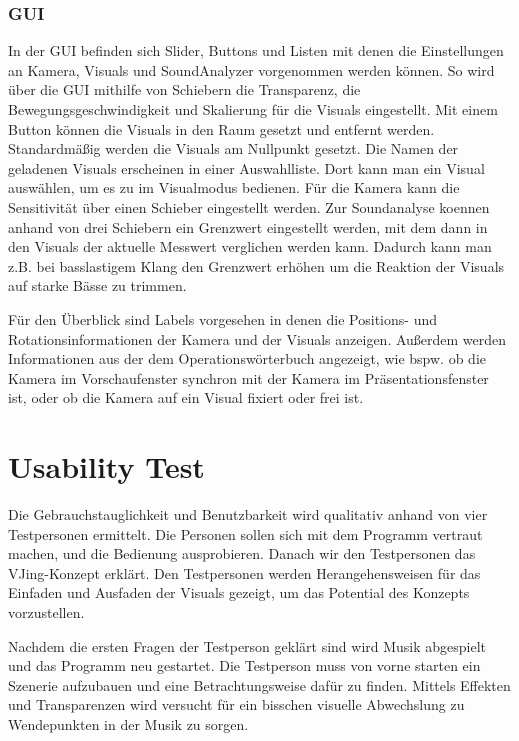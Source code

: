 \subsubsection{GUI}

In der GUI befinden sich Slider, Buttons und Listen mit denen die Einstellungen an Kamera, Visuals und SoundAnalyzer 
vorgenommen werden k\"onnen. So wird \"uber die GUI mithilfe von Schiebern die Transparenz, 
die Bewegungsgeschwindigkeit und Skalierung f\"ur die Visuals eingestellt. Mit einem Button k\"onnen die Visuals in den
Raum gesetzt und entfernt werden. Standardm\"a\ss{}ig werden die Visuals am Nullpunkt gesetzt. Die Namen der geladenen
Visuals erscheinen in einer Auswahlliste. Dort kann man ein Visual ausw\"ahlen, um es zu im Visualmodus bedienen.
F\"ur die Kamera kann die Sensitivit\"at \"uber einen Schieber eingestellt werden. Zur Soundanalyse koennen anhand von
drei Schiebern ein Grenzwert eingestellt werden, mit dem dann in den Visuals der aktuelle Messwert verglichen werden kann.
Dadurch kann man z.B. bei basslastigem Klang den Grenzwert erh\"ohen um die Reaktion der Visuals auf starke B\"asse zu 
trimmen. 

F\"ur den \"Uberblick sind Labels vorgesehen in denen die Positions- und Rotationsinformationen der Kamera und der Visuals
anzeigen. Au\ss{}erdem werden Informationen aus der dem Operationsw\"orterbuch angezeigt, wie bspw. ob die Kamera
im Vorschaufenster synchron mit der Kamera im Pr\"asentationsfenster ist, oder ob die Kamera auf ein Visual fixiert oder
frei ist.

\section{Usability Test}

Die Gebrauchstauglichkeit und Benutzbarkeit wird qualitativ anhand von vier Testpersonen ermittelt. Die Personen sollen
sich mit dem Programm vertraut machen, und die Bedienung ausprobieren. Danach wir den Testpersonen das VJing-Konzept
erkl\"art. Den Testpersonen werden Herangehensweisen f\"ur das Einfaden und Ausfaden der Visuals 
gezeigt, um das Potential des Konzepts vorzustellen. 

Nachdem die ersten Fragen der Testperson gekl\"art sind wird Musik abgespielt und das Programm neu gestartet. Die Testperson
muss von vorne starten ein Szenerie aufzubauen und eine Betrachtungsweise daf\"ur zu finden. Mittels Effekten und Transparenzen
wird versucht f\"ur ein bisschen visuelle Abwechslung zu Wendepunkten in der Musik zu sorgen.

